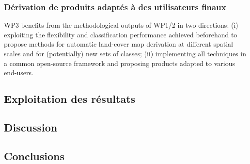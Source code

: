 \subsubsection{Dérivation de produits adaptés à des utilisateurs finaux}


WP3 benefits from the methodological outputs of WP1/2 in two directions: (i) exploiting the flexibility
and classification performance achieved beforehand to propose methods for automatic land-cover map
derivation at different spatial scales and for (potentially) new sets of classes; (ii) implementing all techniques
in a common open-source framework and proposing products adapted to various end-users.


\subsection{Exploitation des résultats}


\subsection{Discussion} 


\subsection{Conclusions}


